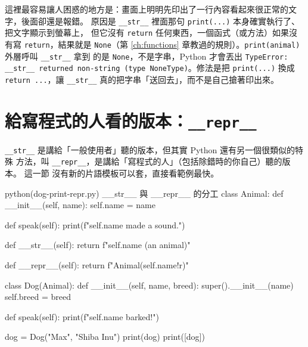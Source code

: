 這裡最容易讓人困惑的地方是：畫面上明明先印出了一行內容看起來很正常的文字，後面卻還是報錯。
原因是 \texttt{\_\_str\_\_} 裡面那句 \texttt{print(...)} 本身確實執行了、把文字顯示到螢幕上，
但它沒有 \texttt{return} 任何東西，一個函式（或方法）如果沒有寫 \texttt{return}，結果就是
\texttt{None}（第 \ref{ch:functions} 章教過的規則）。\texttt{print(animal)} 外層呼叫 \texttt{\_\_str\_\_} 拿到
的是 \texttt{None}，不是字串，Python 才會丟出 \texttt{TypeError: \_\_str\_\_ returned
non-string (type NoneType)}。修法是把 \texttt{print(...)} 換成 \texttt{return ...}，讓
\texttt{\_\_str\_\_} 真的把字串「送回去」，而不是自己搶著印出來。


\section{給寫程式的人看的版本：\texttt{\_\_repr\_\_}}
\label{sec:str-vs-repr}

\texttt{\_\_str\_\_} 是講給「一般使用者」聽的版本，但其實 Python 還有另一個很類似的特殊
方法，叫 \texttt{\_\_repr\_\_}，是講給「寫程式的人」（包括除錯時的你自己）聽的版本。
這一節
沒有新的片語模板可以套，直接看範例最快。

\begin{example}{python}{(dog-print-repr.py) \_\_str\_\_ 與 \_\_repr\_\_ 的分工}
class Animal:
    def __init__(self, name):
        self.name = name

    def speak(self):
        print(f"{self.name} made a sound.")

    def __str__(self):
        return f"{self.name} (an animal)"

    def __repr__(self):
        return f"Animal({self.name!r})"


class Dog(Animal):
    def __init__(self, name, breed):
        super().__init__(name)
        self.breed = breed

    def speak(self):
        print(f"{self.name} barked!")


dog = Dog("Max", "Shiba Inu")
print(dog)
print([dog])
\end{example}


